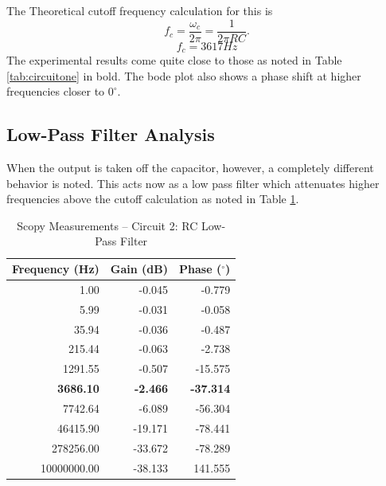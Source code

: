 \documentclass[12pt]{article}
\begin{document}
The Theoretical cutoff frequency calculation for this is \[
	f_c = \frac{\omega_c}{2\pi} = \frac{1}{2\pi RC}.
	\]
	\[
		f_c = 3617Hz
		\]
		The experimental results come quite close to those as noted in
		Table \ref{tab:circuitone} in bold. The bode plot also shows a phase shift at
		higher frequencies closer to $0^\circ$.

\subsection{Low-Pass Filter Analysis}
When the output is taken off the capacitor, however, a completely different
behavior is noted. This acts now as a low pass filter which attenuates higher
frequencies above the cutoff calculation as noted in Table \ref{tab:circuittwo}.

\begin{table}[H]
	\centering
	\begin{tabular}{|r|r|r|}
		\hline
		\textbf{Frequency (Hz)} & \textbf{Gain (dB)} & \textbf{Phase ($^\circ$)} \\
		\hline
		1.00                    & -0.045             & -0.779                    \\
		5.99                    & -0.031             & -0.058                    \\
		35.94                   & -0.036             & -0.487                    \\
		215.44                  & -0.063             & -2.738                    \\
		1291.55                 & -0.507             & -15.575                   \\
		\textbf{3686.10}        & \textbf{-2.466}    & \textbf{-37.314}          \\
		7742.64                 & -6.089             & -56.304                   \\
		46415.90                & -19.171            & -78.441                   \\
		278256.00               & -33.672            & -78.289                   \\
		10000000.00             & -38.133            & 141.555                   \\
		\hline
	\end{tabular}
	\caption{Scopy Measurements – Circuit 2: RC Low-Pass Filter}
	\label{tab:circuittwo}
\end{table}
\end{document}
